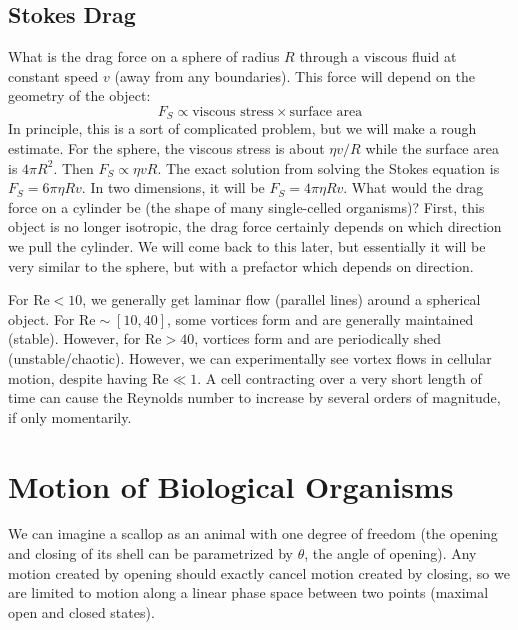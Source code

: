 \documentclass[a4paper,twoside,master.tex]{subfiles}
\begin{document}
\subsection{Stokes Drag}\label{sub:stokes_drag}

What is the drag force on a sphere of radius $ R $ through a viscous fluid at constant speed $ v $ (away from any boundaries). This force will depend on the geometry of the object:
\begin{equation}
    F_S \propto \text{viscous stress} \times \text{surface area} \tag{Stokes Drag Force}
\end{equation}
In principle, this is a sort of complicated problem, but we will make a rough estimate. For the sphere, the viscous stress is about $ \eta v / R $ while the surface area is $ 4 \pi R^2 $. Then $ F_S \propto \eta v R $. The exact solution from solving the Stokes equation is $ F_S = 6 \pi \eta R v $. In two dimensions, it will be $ F_S = 4 \pi \eta R v $. What would the drag force on a cylinder be (the shape of many single-celled organisms)? First, this object is no longer isotropic, the drag force certainly depends on which direction we pull the cylinder. We will come back to this later, but essentially it will be very similar to the sphere, but with a prefactor which depends on direction.

For $ \text{Re} < 10 $, we generally get laminar flow (parallel lines) around a spherical object. For $ \text{Re} \sim [10, 40] $, some vortices form and are generally maintained (stable). However, for $ \text{Re} > 40 $, vortices form and are periodically shed (unstable/chaotic). However, we can experimentally see vortex flows in cellular motion, despite having $ \text{Re} \ll 1 $. A cell contracting over a very short length of time can cause the Reynolds number to increase by several orders of magnitude, if only momentarily. 

\section{Motion of Biological Organisms}\label{sec:motion_of_biological_organisms}

We can imagine a scallop as an animal with one degree of freedom (the opening and closing of its shell can be parametrized by $ \theta $, the angle of opening). Any motion created by opening should exactly cancel motion created by closing, so we are limited to motion along a linear phase space between two points (maximal open and closed states).
\end{document}
